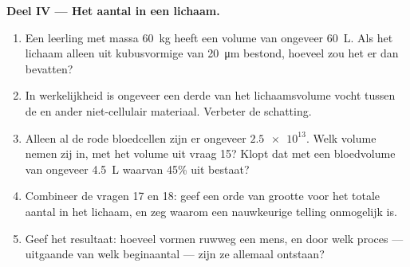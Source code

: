 \begin{problem}
\medskip
\noindent\textbf{Deel IV --- Het aantal  in een lichaam.}
\begin{enumerate}[resume]
  \item Een leerling met massa \qty{60}{kg} heeft een volume van
        ongeveer \qty{60}{L}. Als het lichaam alleen uit kubusvormige
         van \qty{20}{\micro m} bestond, hoeveel zou het er dan
        bevatten?
  \item In werkelijkheid is ongeveer een derde van het lichaamsvolume
        vocht tussen de  en ander niet-cellulair materiaal.
        Verbeter de schatting.
  \item Alleen al de rode bloedcellen zijn er ongeveer $\num{2.5e13}$.
        Welk volume nemen zij in, met het volume uit vraag 15? Klopt dat
        met een bloedvolume van ongeveer \qty{4.5}{L} waarvan 45\% uit
         bestaat?
  \item Combineer de vragen 17 en 18: geef een orde van grootte voor het
        totale aantal  in het lichaam, en zeg waarom een
        nauwkeurige telling onmogelijk is.
  \item Geef het resultaat: hoeveel  vormen ruwweg een mens, en
        door welk proces --- uitgaande van welk beginaantal --- zijn ze
        allemaal ontstaan?
\end{enumerate}
\end{problem}
